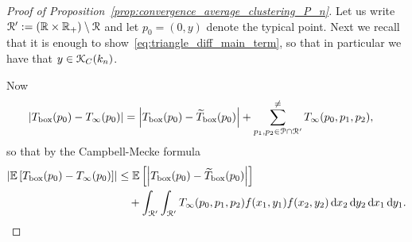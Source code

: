 \begin{proof}[Proof of Proposition~\ref{prop:convergence_average_clustering_P_n}]
Let us write ${\mathcal R}^\prime := ({\mathbb R} \times {\ensuremath{\mathbb R}}_+) \setminus {\mathcal R}$ and let $p_0 = (0,y)$ denote the typical point. Next we recall that it is enough to show~\eqref{eq:triangle_diff_main_term}, so that in particular we have that $y \in {\mathcal K}_{C}(k_n)$.

Now
\begin{align*}
	\left|T_{\text{box}}(p_0) - T_{\infty}(p_0)\right| 
	&= \left|T_{\text{box}}(p_0) - \widetilde{T}_{\text{box}}(p_0)\right| 
		+ \sum_{p_1, p_2 \in {\mathcal P} \cap {\mathcal R}^\prime}^{\ne} T_{\infty}(p_0,p_1,p_2),
\end{align*}
so that by the Campbell-Mecke formula
\begin{align*}
	\left|\mathbb{E}\left[T_{\text{box}}(p_0) - T_{\infty}(p_0)\right]\right|
	&\le \mathbb{E}\left[\left|T_{\text{box}}(p_0) - \widetilde{T}_{\text{box}}(p_0)\right|\right]\\
	&\hspace{10pt}+ \int_{{\mathcal R}^\prime}\int_{{\mathcal R}^\prime} T_{\infty}(p_0,p_1,p_2) f(x_1,y_1) f(x_2,y_2)
		\operatorname{\mathrm{d}\hspace{-2pt}} x_2 \operatorname{\mathrm{d}\hspace{-2pt}} y_2 \operatorname{\mathrm{d}\hspace{-2pt}} x_1 \operatorname{\mathrm{d}\hspace{-2pt}} y_1. 
\end{align*}


\end{proof}

